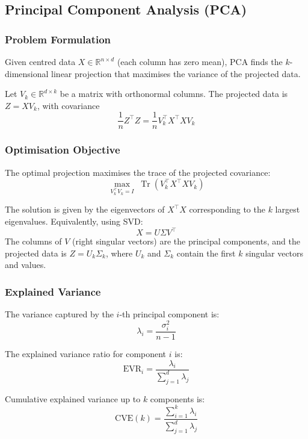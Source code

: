 \documentclass[11pt]{article}
\begin{document}
\subsection{Principal Component Analysis (PCA)}

\subsubsection{Problem Formulation}

Given centred data $X \in \mathbb{R}^{n \times d}$ (each column has zero mean), PCA finds the $k$-dimensional linear projection that maximises the variance of the projected data.

Let $V_k \in \mathbb{R}^{d \times k}$ be a matrix with orthonormal columns. The projected data is $Z = X V_k$, with covariance
\[
    \frac{1}{n} Z^\top Z = \frac{1}{n} V_k^\top X^\top X V_k
\]

\subsubsection{Optimisation Objective}

The optimal projection maximises the trace of the projected covariance:
\[
    \max_{V_k^\top V_k = I} \; \operatorname{Tr}\!\left(V_k^\top X^\top X V_k\right)
\]

The solution is given by the eigenvectors of $X^\top X$ corresponding to the $k$ largest eigenvalues. Equivalently, using SVD:
\[
    X = U \Sigma V^\top
\]
The columns of $V$ (right singular vectors) are the principal components, and the projected data is $Z = U_k \Sigma_k$, where $U_k$ and $\Sigma_k$ contain the first $k$ singular vectors and values.

\subsubsection{Explained Variance}

The variance captured by the $i$-th principal component is:
\[
    \lambda_i = \frac{\sigma_i^2}{n - 1}
\]

The explained variance ratio for component $i$ is:
\[
    \mathrm{EVR}_i = \frac{\lambda_i}{\sum_{j=1}^{d} \lambda_j}
\]

Cumulative explained variance up to $k$ components is:
\[
    \mathrm{CVE}(k) = \frac{\sum_{i=1}^{k} \lambda_i}{\sum_{j=1}^{d} \lambda_j}
\]
\end{document}
